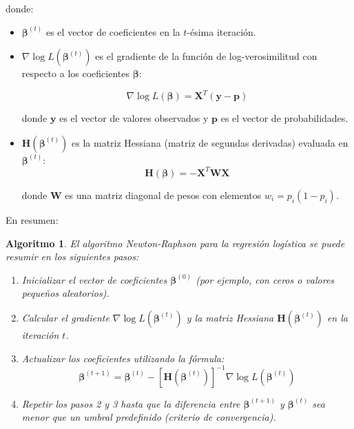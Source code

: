 \documentclass[a4paper]{report} %
\newtheorem{Algthm}{Algoritmo}[chapter]
\begin{document}
donde:
\begin{itemize}
    \item $\boldsymbol{\beta}^{(t)}$ es el vector de coeficientes en la $t$-ésima iteración.
    \item $\nabla \log L(\boldsymbol{\beta}^{(t)})$ es el gradiente de la función de log-verosimilitud con respecto a los coeficientes $\boldsymbol{\beta}$:

\begin{equation}\label{Eq.Gradiente1}
\nabla \log L(\boldsymbol{\beta}) = \mathbf{X}^T (\mathbf{y} - \mathbf{p})
\end{equation}

donde $\mathbf{y}$ es el vector de valores observados y $\mathbf{p}$ es el vector de probabilidades.
    \item $\mathbf{H}(\boldsymbol{\beta}^{(t)})$ es la matriz Hessiana (matriz de segundas derivadas) evaluada en $\boldsymbol{\beta}^{(t)}$:
\begin{equation}\label{Eq.Hessiana1}
\mathbf{H}(\boldsymbol{\beta}) = -\mathbf{X}^T \mathbf{W} \mathbf{X}
\end{equation}

donde $\mathbf{W}$ es una matriz diagonal de pesos con elementos $w_i = p_i (1 - p_i)$.

\end{itemize}

En resumen:

\begin{Algthm}\label{Algoritmo1}
El algoritmo Newton-Raphson para la regresión logística se puede resumir en los siguientes pasos:
\begin{enumerate}
    \item Inicializar el vector de coeficientes $\boldsymbol{\beta}^{(0)}$ (por ejemplo, con ceros o valores pequeños aleatorios).
    \item Calcular el gradiente $\nabla \log L(\boldsymbol{\beta}^{(t)})$ y la matriz Hessiana $\mathbf{H}(\boldsymbol{\beta}^{(t)})$ en la iteración $t$.
    \item Actualizar los coeficientes utilizando la fórmula:
    \begin{equation}\label{Eq.Criterio1}
    \boldsymbol{\beta}^{(t+1)} = \boldsymbol{\beta}^{(t)} - \left[ \mathbf{H}(\boldsymbol{\beta}^{(t)}) \right]^{-1} \nabla \log L(\boldsymbol{\beta}^{(t)})
    \end{equation}
    \item Repetir los pasos 2 y 3 hasta que la diferencia entre $\boldsymbol{\beta}^{(t+1)}$ y $\boldsymbol{\beta}^{(t)}$ sea menor que un umbral predefinido (criterio de convergencia).
\end{enumerate}
\end{Algthm}
\end{document}

